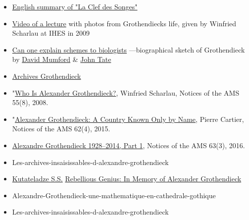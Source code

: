 \begin{itemize}
\item
  {\href{http://www.landsburg.com/grothendieck/clef.pdf}{English summary of "La Clef des Songes"}}
\item
  {\href{https://www.dailymotion.com/video/x8juek_colloque-grothendieck-winfried-scha_tech}{Video of a lecture} with photos from Grothendieck\textquotesingle s life, given by Winfried Scharlau at IHES in 2009}
\item
  {\href{https://www.dam.brown.edu/people/mumford/blog/2014/Grothendieck.html}{Can one explain schemes to biologists} ---biographical sketch of Grothendieck by \href{https://en.wikipedia.org/wiki/David_Mumford}{David Mumford} \& \href{https://en.wikipedia.org/wiki/John_Tate_(mathematician)}{John Tate}}
\item
  {\href{https://grothendieck.umontpellier.fr/archives-grothendieck/}{Archives Grothendieck}}
\item
  {"\href{https://www.ams.org/notices/200808/tx080800930p.pdf}{Who Is Alexander Grothendieck?}, Winfried Scharlau, Notices of the AMS 55(8), 2008.}
\item
  {"\href{https://www.ams.org/notices/201504/rnoti-p373.pdf}{Alexander Grothendieck: A Country Known Only by Name}, Pierre Cartier, Notices of the AMS 62(4), 2015.}
\item
  {\href{http://matematicas.unex.es/~navarro/res/notices201603.pdf}{Alexandre Grothendieck 1928--2014, Part 1}, Notices of the AMS 63(3), 2016.}
\item
  {Les-archives-insaisissables-d-alexandre-grothendieck}
\item
  {\href{https://en.wikipedia.org/wiki/Semen_Samsonovich_Kutateladze}{Kutateladze S.S.} \href{http://www.math.nsc.ru/LBRT/g2/english/ssk/rebellious_genius_e.html}{Rebellious Genius: In Memory of Alexander Grothendieck}}
\item
  {Alexandre-Grothendieck-une-mathematique-en-cathedrale-gothique}
\item
  {Les-archives-insaisissables-d-alexandre-grothendieck}
\end{itemize}





{}
